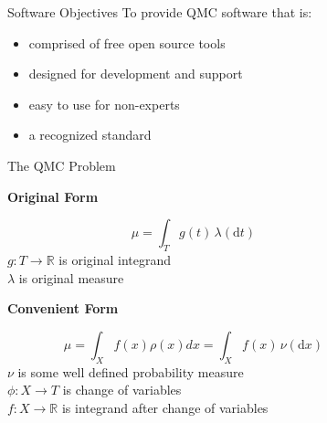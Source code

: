 \documentclass[final]{beamer}
\newcommand{\bfCenter}[1]{\centerline{\textbf{#1}}}
\newlength{\sepwid}
\newlength{\onecolwid}
\newlength{\threecolwid}
\newcommand{\dif}{\mathrm{d}}
\begin{document}
\setlength{\belowcaptionskip}{2ex}
\setlength\belowdisplayshortskip{2ex}
\begin{frame}[t]
\vspace{-2ex}
\begin{columns}[t]

\begin{column}{\sepwid}\end{column}
\begin{column}{\threecolwid}
\begin{columns}[t,totalwidth=\threecolwid]  

\begin{column}{\onecolwid}\vspace{-1in}
\begin{block}{Software Objectives}
    To provide QMC software \cite{HicEtal19} that is: 
    \begin{itemize}
        \item comprised of free open source tools
        \item designed for development and support 
        \item easy to use for non-experts
        \item a recognized standard
    \end{itemize}
\end{block}

\vspace{-2ex}
\begin{block}{The QMC Problem}
    \bfCenter{Original Form}
        \begin{equation*}
            \mu = \int_{T} g(t) \, \lambda(\dif t) 
            \label{eq:ogProblem}
        \end{equation*}
        $ g:T \rightarrow \mathbb{R}  $ is original integrand \\
        $ \lambda $ is original measure

    \vspace{2ex}
    \bfCenter{Convenient Form}
        \begin{equation*}
            \mu = \int_{X} f(x)\rho(x)dx = \int_{X} f(x) \, \nu( \dif x)
            \label{convForm}
        \end{equation*}
        $\nu  $ is some well defined probability measure\\
        $\phi: X \rightarrow T $ is change of variables\\
        $f: X \rightarrow \mathbb{R} $ is integrand after change of variables
        

\end{block}
\end{column}
\end{columns}
\end{column}
\end{columns}
\end{frame}
\end{document}
